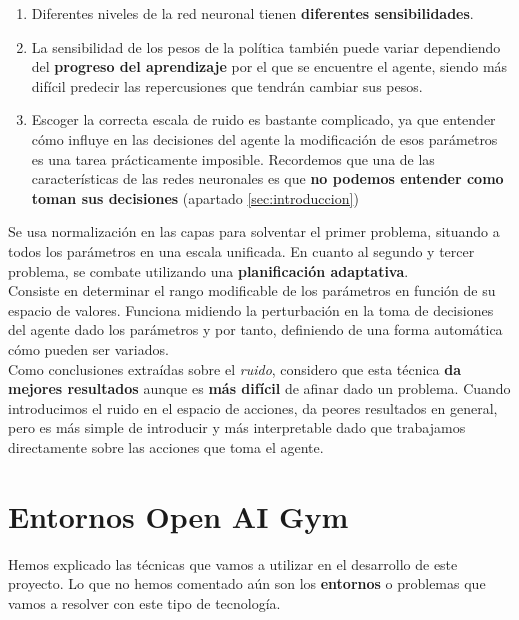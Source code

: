 \documentclass[11pt,fleqn]{book} %
\begin{document}
\begin{enumerate}
	\item Diferentes niveles de la red neuronal tienen \textbf{diferentes sensibilidades}. \\ 
	
	\item La sensibilidad de los pesos de la política también puede variar dependiendo del \textbf{progreso del aprendizaje} por el que se encuentre el agente, siendo más difícil predecir las repercusiones que tendrán cambiar sus pesos. \\ 
	
	\item Escoger la correcta escala de ruido es bastante complicado, ya que entender cómo influye en las decisiones del agente la modificación de esos parámetros es una tarea prácticamente imposible. Recordemos que una de las características de las redes neuronales es que \textbf{no podemos entender como toman sus decisiones} (apartado \ref{sec:introduccion}) \\
\end{enumerate}

Se usa normalización en las capas para solventar el primer problema, situando a todos los parámetros en una escala unificada. En cuanto al segundo y tercer problema, se combate utilizando una \textbf{planificación adaptativa}. \\

Consiste en determinar el rango modificable de los parámetros en función de su espacio de valores. Funciona midiendo la perturbación en la toma de decisiones del agente dado los parámetros y por tanto, definiendo de una forma automática cómo pueden ser variados. \\

Como conclusiones extraídas sobre el \textit{ruido}, considero que esta técnica \textbf{da mejores resultados} aunque es \textbf{más difícil} de afinar dado un problema. Cuando introducimos el ruido en el espacio de acciones, da peores resultados en general, pero es más simple de introducir y más interpretable dado que trabajamos directamente sobre las acciones que toma el agente. \cite{article:DDPG} \cite{article:DDPG_2}

\chapter{Entornos Open AI Gym}\label{sec:entornos}

Hemos explicado las técnicas que vamos a utilizar en el desarrollo de este proyecto. Lo que no hemos comentado aún son los \textbf{entornos} o problemas que vamos a resolver con este tipo de tecnología. \\
\end{document}
